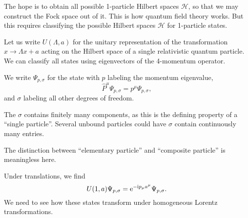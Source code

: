 \begin{remark}
The hope is to obtain all possible 1-particle Hilbert spaces
$\mathcal{H}$, so that we may construct the Fock space out of it. This
is how quantum field theory works. But this requires classifying the
possible Hilbert spaces $\mathcal{H}$ for 1-particle states.
\end{remark}

\M
Let us write $U(\Lambda,a)$ for the unitary representation of the
transformation $x\to\Lambda x + a$ acting on the Hilbert space of a
single relativistic quantum particle. 
We can classify all states using eigenvectors of the 4-momentum
operator.

We write $\Psi_{p,\sigma}$ for the state with $p$ labeling the momentum eigenvalue,
\begin{equation}
\widehat{P}^{\mu}\Psi_{p,\sigma}=p^{\mu}\Psi_{p,\sigma},
\end{equation}
and $\sigma$ labeling all other degrees of freedom.

\begin{remark}
The $\sigma$ contains finitely many components, as this is the defining
property of a ``single particle''. Several unbound particles could have
$\sigma$ contain continuously many entries.
\end{remark}

\begin{remark}
The distinction between ``elementary particle'' and ``composite particle''
is meaningless here.
\end{remark}

Under translations, we find
\begin{equation}
U(1, a)\Psi_{p,\sigma} = \mathrm{e}^{-\mathrm{i} p_{\mu}a^{\mu}}\Psi_{p,\sigma}.
\end{equation}
We need to see how these states transform under homogeneous Lorentz
transformations. 

